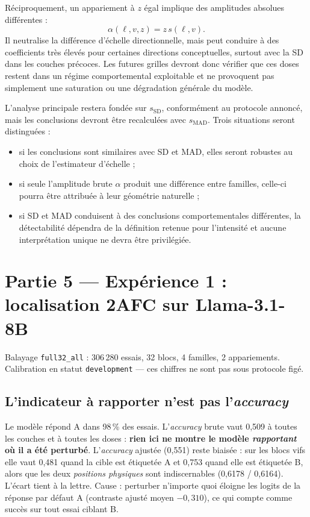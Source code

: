 \documentclass[a4paper,10pt]{article}
\newcommand{\pc}[1]{#1\,\%}
\begin{document}
Réciproquement, un appariement à $z$ égal implique des amplitudes absolues
différentes :
\[
\alpha(\ell,v,z)=z\,s(\ell,v).
\]
Il neutralise la différence d'échelle directionnelle, mais peut conduire à des
coefficients très élevés pour certaines directions conceptuelles, surtout avec
la SD dans les couches précoces. Les futures grilles devront donc vérifier que
ces doses restent dans un régime comportemental exploitable et ne provoquent
pas simplement une saturation ou une dégradation générale du modèle.

L'analyse principale restera fondée sur $s_{\mathrm{SD}}$, conformément au
protocole annoncé, mais les conclusions devront être recalculées avec
$s_{\mathrm{MAD}}$. Trois situations seront distinguées :

\begin{itemize}
  \item si les conclusions sont similaires avec SD et MAD, elles seront robustes
        au choix de l'estimateur d'échelle ;
  \item si seule l'amplitude brute $\alpha$ produit une différence entre
        familles, celle-ci pourra être attribuée à leur géométrie naturelle ;
  \item si SD et MAD conduisent à des conclusions comportementales différentes,
        la détectabilité dépendra de la définition retenue pour l'intensité et
        aucune interprétation unique ne devra être privilégiée.
\end{itemize}




\section{Partie 5 --- Expérience 1 : localisation 2AFC sur Llama-3.1-8B}

Balayage \texttt{full32\_all} : 306\,280 essais, 32 blocs, 4 familles, 2 appariements.
Calibration en statut \texttt{development} --- ces chiffres ne sont pas sous protocole figé.

\subsection{L'indicateur à rapporter n'est pas l'\emph{accuracy}}

Le modèle répond \og A\fg{} dans \pc{98} des essais. L'\emph{accuracy} brute vaut 0,509 à toutes les
couches et à toutes les doses : \textbf{rien ici ne montre le modèle \emph{rapportant} où il a été
perturbé}. L'\emph{accuracy} ajustée (0,551) reste biaisée : sur les blocs vifs elle vaut 0,481
quand la cible est étiquetée A et 0,753 quand elle est étiquetée B, alors que les deux \emph{positions
physiques} sont indiscernables (0,6178 / 0,6164). L'écart tient à la lettre. Cause : perturber
n'importe quoi éloigne les logits de la réponse par défaut A (contraste ajusté moyen $-0{,}310$),
ce qui compte comme succès sur tout essai ciblant B.
\end{document}
